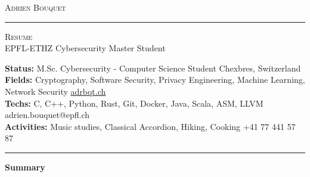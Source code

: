 \documentclass[10pt,A4]{article}
\newcommand{\cvsection}[1]
{
	\begin{center}
		\large\textcolor{sectcol}{\textbf{#1}}
	\end{center}
}
\newcommand{\metasection}[2]
{
\footnotesize{#2} \hspace*{\fill} \footnotesize{#1}\\[1pt]
}
\begin{document}
\pagestyle{fancy}	








\vspace{-8pt}
\begin{center}
	\HUGE \textsc{Adrien Bouquet} \textcolor{sectcol}{\rule[-1mm]{1mm}{0.9cm}} \textsc{Resume}\\[2pt]
	\small EPFL-ETHZ Cybersecurity Master Student
\end{center}



\vspace{6pt}


\metasection{Chexbres, Switzerland}{\textbf{Status:} M.Sc. Cybersecurity - Computer Science Student}
\metasection{\href{www.adrbqt.ch}{adrbqt.ch}}{\textbf{Fields:} Cryptography, Software Security, Privacy Engineering, Machine Learning, Network Security} 
\metasection{adrien.bouquet@epfl.ch}{\textbf{Techs:} C, C++, Python, Rust, Git, Docker, Java, Scala, ASM, LLVM}
\metasection{+41 77 441 57 87}{\textbf{Activities:} Music studies, Classical Accordion, Hiking, Cooking }
\vspace{-2pt}
\textcolor{softcol}{\hrule}
\vspace{6pt}

\normalsize

\vspace{-6pt}
\cvsection{Summary}
\end{document}
